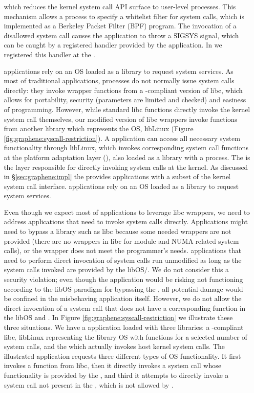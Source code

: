which reduces the kernel
system call API surface to user-level processes. This mechanism allows
a process to specify a whitelist filter for system calls, which is
implemented as a Berkeley Packet Filter (BPF) program. The invocation
of a disallowed system call causes the application to throw a SIGSYS
signal, which can be caught by a registered handler provided by the
application. In \sysname{} we registered this handler at the \pal{}.


\sysname{} applications rely on an OS loaded as a library to request
system services. As most of traditional applications, \sysname{}
processes do not normally issue system calls directly: they invoke
wrapper functions from a \sysname{}-compliant version of libc, which
allows for portability, security (parameters are limited and checked)
and easiness of programming. However, while standard libc functions
directly invoke the kernel system call themselves, our modified
version of libc wrappers invoke functions from another library which
represents the OS, libLinux (Figure \ref{fig:graphene:syscall-restriction}). A
\sysname{} application can access all necessary system functionality
through libLinux, which invokes corresponding system call functions at
the platform adaptation layer (\pal{}), also loaded as a library with a
\sysname{} process. The \pal{} is the layer responsible for directly
invoking system calls at the kernel. As discussed in \S\ref{sec:graphene:impl} the \pal{} provides \sysname{} applications with a
subset of the kernel system call interface.\sysname{} applications rely
on an OS loaded as a library to request system services.

Even though we expect most of \sysname{} applications to leverage libc
wrappers, we need to address applications that need to invoke system
calls directly. Applications might need to bypass a library such as
libc because some needed wrappers are not provided (there are no
wrappers in libc for module and NUMA related system calls), or the
wrapper does not meet the programmer’s needs. \sysname{} applications
that need to perform direct invocation of system calls run unmodified
as long as the system calls invoked are provided by the libOS/\pal{}. We
do not consider this a security violation; even though the application
would be risking not functioning according to the libOS paradigm for
bypassing the \pal{}, all potential damage would be confined in the
misbehaving application itself.  However, we do not allow the direct
invocation of a system call that does not have a corresponding
function in the libOS and \pal{}. In Figure \ref{fig:graphene:syscall-restriction}
we illustrate these three situations. We have a \sysname{} application
loaded with three libraries: a \sysname{}-compliant libc, libLinux
representing the library OS with functions for a selected number of
system calls, and the \pal{} which actually invokes host kernel system
calls. The illustrated application requests three different types of
OS functionality. It first invokes a function from libc, then it
directly invokes a system call whose functionality is provided by the
\pal{}, and third it attempts to directly invoke a system call not
present in the \pal{}, which is not allowed by \sysname{}.


